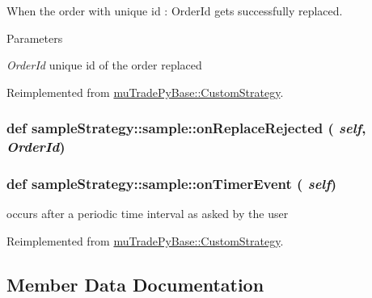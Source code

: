 When the order with unique id : OrderId gets successfully replaced. 
\begin{DoxyParams}{Parameters}
\item[{\em OrderId}]unique id of the order replaced \end{DoxyParams}


Reimplemented from \hyperlink{classmuTradePyBase_1_1CustomStrategy_a85a80a9afefdf345a46c520fad9b5138}{muTradePyBase::CustomStrategy}.\hypertarget{classsampleStrategy_1_1sample_a66bfb1076effa11ba4cb0f50e7252290}{
\subsubsection[{onReplaceRejected}]{\setlength{\rightskip}{0pt plus 5cm}def sampleStrategy::sample::onReplaceRejected ( {\em self}, \/   {\em OrderId})}}
\label{classsampleStrategy_1_1sample_a66bfb1076effa11ba4cb0f50e7252290}
\hypertarget{classsampleStrategy_1_1sample_a4cee019e70ecc59d7c8f6d3332674e3b}{
\subsubsection[{onTimerEvent}]{\setlength{\rightskip}{0pt plus 5cm}def sampleStrategy::sample::onTimerEvent ( {\em self})}}
\label{classsampleStrategy_1_1sample_a4cee019e70ecc59d7c8f6d3332674e3b}


occurs after a periodic time interval as asked by the user 

Reimplemented from \hyperlink{classmuTradePyBase_1_1CustomStrategy_add6aa61bb18c2c3a4de459865fe83f62}{muTradePyBase::CustomStrategy}.

\subsection{Member Data Documentation}
\hypertarget{classsampleStrategy_1_1sample_af77b1aa404dd23099c1304660aba21c7}{
\subsubsection[{f}]{}}
\label{classsampleStrategy_1_1sample_af77b1aa404dd23099c1304660aba21c7}


